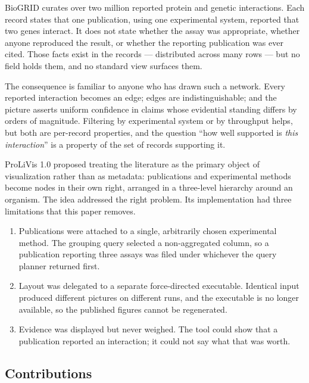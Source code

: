 \documentclass[conference]{IEEEtran}
\begin{document}
BioGRID \cite{biogrid} curates over two million reported protein and genetic
interactions. Each record states that one publication, using one experimental system,
reported that two genes interact. It does not state whether the assay was appropriate,
whether anyone reproduced the result, or whether the reporting publication was ever
cited. Those facts exist in the records --- distributed across many rows --- but no
field holds them, and no standard view surfaces them.

The consequence is familiar to anyone who has drawn such a network. Every reported
interaction becomes an edge; edges are indistinguishable; and the picture asserts
uniform confidence in claims whose evidential standing differs by orders of magnitude.
Filtering by experimental system or by throughput helps, but both are per-record
properties, and the question ``how well supported is \emph{this interaction}'' is a
property of the set of records supporting it.

ProLiVis 1.0 \cite{prolivis1} proposed treating the literature as the primary object of
visualization rather than as metadata: publications and experimental methods become
nodes in their own right, arranged in a three-level hierarchy around an organism. The
idea addressed the right problem. Its implementation had three limitations that this
paper removes.

\begin{enumerate}
  \item Publications were attached to a single, arbitrarily chosen experimental method.
        The grouping query selected a non-aggregated column, so a publication reporting
        three assays was filed under whichever the query planner returned first.
  \item Layout was delegated to a separate force-directed executable. Identical input
        produced different pictures on different runs, and the executable is no longer
        available, so the published figures cannot be regenerated.
  \item Evidence was displayed but never weighed. The tool could show that a
        publication reported an interaction; it could not say what that was worth.
\end{enumerate}

\subsection{Contributions}
\end{document}
